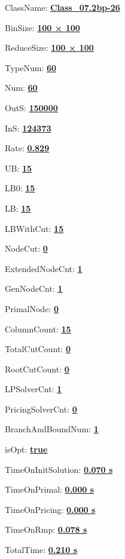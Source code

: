 \documentclass[11pt]{article}
\begin{document}
\pagestyle{empty}


ClassName: \underline{\textbf{Class_07.2bp-26}}
\par
BinSize: \underline{\textbf{100 × 100}}
\par
ReduceSize: \underline{\textbf{100 × 100}}
\par
TypeNum: \underline{\textbf{60}}
\par
Num: \underline{\textbf{60}}
\par
OutS: \underline{\textbf{150000}}
\par
InS: \underline{\textbf{124373}}
\par
Rate: \underline{\textbf{0.829}}
\par
UB: \underline{\textbf{15}}
\par
LB0: \underline{\textbf{15}}
\par
LB: \underline{\textbf{15}}
\par
LBWithCut: \underline{\textbf{15}}
\par
NodeCut: \underline{\textbf{0}}
\par
ExtendedNodeCnt: \underline{\textbf{1}}
\par
GenNodeCnt: \underline{\textbf{1}}
\par
PrimalNode: \underline{\textbf{0}}
\par
ColumnCount: \underline{\textbf{15}}
\par
TotalCutCount: \underline{\textbf{0}}
\par
RootCutCount: \underline{\textbf{0}}
\par
LPSolverCnt: \underline{\textbf{1}}
\par
PricingSolverCnt: \underline{\textbf{0}}
\par
BranchAndBoundNum: \underline{\textbf{1}}
\par
isOpt: \underline{\textbf{true}}
\par
TimeOnInitSolution: \underline{\textbf{0.070 s}}
\par
TimeOnPrimal: \underline{\textbf{0.000 s}}
\par
TimeOnPricing: \underline{\textbf{0.000 s}}
\par
TimeOnRmp: \underline{\textbf{0.078 s}}
\par
TotalTime: \underline{\textbf{0.210 s}}
\par
\newpage


\end{document}
